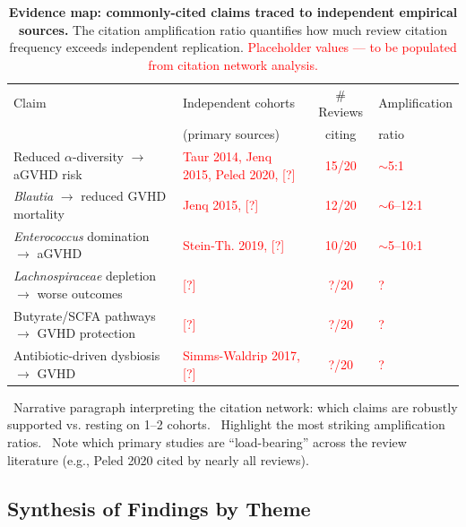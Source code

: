 \documentclass[11pt,a4paper]{article}
\newcommand{\todoitem}[1]{\textcolor{blue!70!black}{\textbullet~#1}}
\begin{document}
\begin{table}[htbp]
\centering
\caption{\textbf{Evidence map: commonly-cited claims traced to independent empirical sources.} The citation amplification ratio quantifies how much review citation frequency exceeds independent replication. \textcolor{red}{Placeholder values --- to be populated from citation network analysis.}}
\label{tab:evidence_map}
\small
\renewcommand{\arraystretch}{1.3}
\begin{tabular}{@{}p{4cm}p{3.5cm}cp{2.8cm}@{}}
\toprule
Claim & Independent cohorts & \# Reviews & Amplification \\
 & (primary sources) & citing & ratio \\
\midrule
Reduced $\alpha$-diversity $\to$ aGVHD risk & \textcolor{red}{Taur 2014, Jenq 2015, Peled 2020, [?]} & \textcolor{red}{15/20} & \textcolor{red}{$\sim$5:1} \\
\addlinespace
\textit{Blautia} $\to$ reduced GVHD mortality & \textcolor{red}{Jenq 2015, [?]} & \textcolor{red}{12/20} & \textcolor{red}{$\sim$6--12:1} \\
\addlinespace
\textit{Enterococcus} domination $\to$ aGVHD & \textcolor{red}{Stein-Th. 2019, [?]} & \textcolor{red}{10/20} & \textcolor{red}{$\sim$5--10:1} \\
\addlinespace
\textit{Lachnospiraceae} depletion $\to$ worse outcomes & \textcolor{red}{[?]} & \textcolor{red}{?/20} & \textcolor{red}{?} \\
\addlinespace
Butyrate/SCFA pathways $\to$ GVHD protection & \textcolor{red}{[?]} & \textcolor{red}{?/20} & \textcolor{red}{?} \\
\addlinespace
Antibiotic-driven dysbiosis $\to$ GVHD & \textcolor{red}{Simms-Waldrip 2017, [?]} & \textcolor{red}{?/20} & \textcolor{red}{?} \\
\bottomrule
\end{tabular}
\end{table}

\todoitem{Narrative paragraph interpreting the citation network: which claims are robustly supported vs. resting on 1--2 cohorts.}
\todoitem{Highlight the most striking amplification ratios.}
\todoitem{Note which primary studies are ``load-bearing'' across the review literature (e.g., Peled 2020 cited by nearly all reviews).}


\subsection{Synthesis of Findings by Theme}
\label{sec:synthesis}
\end{document}
